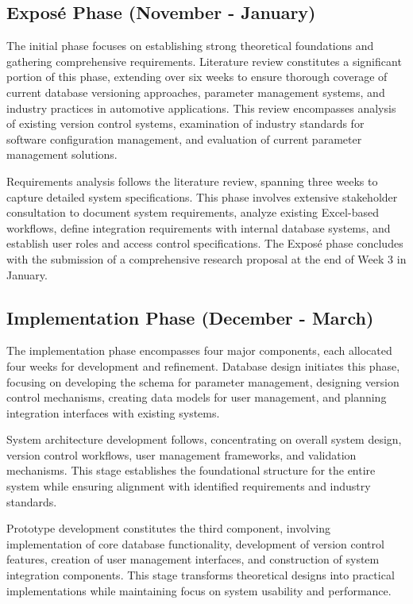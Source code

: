 \subsection{Exposé Phase (November - January)}

The initial phase focuses on establishing strong theoretical foundations and gathering comprehensive requirements. Literature review constitutes a significant portion of this phase, extending over six weeks to ensure thorough coverage of current database versioning approaches, parameter management systems, and industry practices in automotive applications. This review encompasses analysis of existing version control systems, examination of industry standards for software configuration management, and evaluation of current parameter management solutions.

Requirements analysis follows the literature review, spanning three weeks to capture detailed system specifications. This phase involves extensive stakeholder consultation to document system requirements, analyze existing Excel-based workflows, define integration requirements with internal database systems, and establish user roles and access control specifications. The Exposé phase concludes with the submission of a comprehensive research proposal at the end of Week 3 in January.

\subsection{Implementation Phase (December - March)}

The implementation phase encompasses four major components, each allocated four weeks for development and refinement. Database design initiates this phase, focusing on developing the schema for parameter management, designing version control mechanisms, creating data models for user management, and planning integration interfaces with existing systems. 

System architecture development follows, concentrating on overall system design, version control workflows, user management frameworks, and validation mechanisms. This stage establishes the foundational structure for the entire system while ensuring alignment with identified requirements and industry standards.

Prototype development constitutes the third component, involving implementation of core database functionality, development of version control features, creation of user management interfaces, and construction of system integration components. This stage transforms theoretical designs into practical implementations while maintaining focus on system usability and performance.

